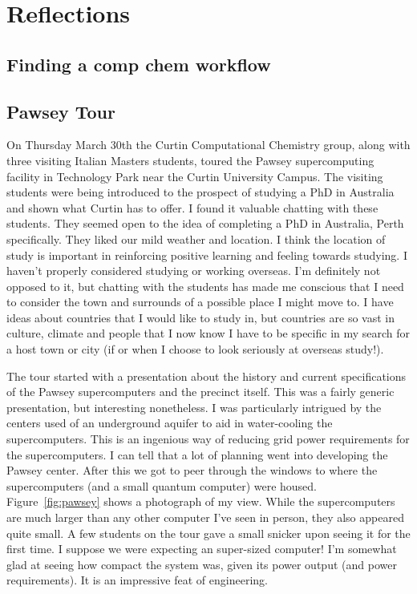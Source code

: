 \documentclass[11pt]{article}
\begin{document}
\section{Reflections}

\subsection{Finding a comp chem workflow}
\subsection{Pawsey Tour}

On Thursday March 30th the Curtin Computational Chemistry group, along with three visiting Italian Masters students, toured the Pawsey supercomputing facility in Technology Park near the Curtin University Campus. The visiting students were being introduced to the prospect of studying a PhD in Australia and shown what Curtin has to offer. I found it valuable chatting with these students. They seemed open to the idea of completing a PhD in Australia, Perth specifically. They liked our mild weather and location. I think the location of study is important in reinforcing positive learning and feeling towards studying. I haven't properly considered studying or working overseas. I'm definitely not opposed to it, but chatting with the students has made me conscious that I need to consider the town and surrounds of a possible place I might move to. I have ideas about countries that I would like to study in, but countries are so vast in culture, climate and people that I now know I have to be specific in my search for a host town or city (if or when I choose to look seriously at overseas study!).

The tour started with a presentation about the history and current specifications of the Pawsey supercomputers and the precinct itself. This was a fairly generic presentation, but interesting nonetheless. I was particularly intrigued by the centers used of an underground aquifer to aid in water-cooling the supercomputers. This is an ingenious way of reducing grid power requirements for the supercomputers. I can tell that a lot of planning went into developing the Pawsey center. After this we got to peer through the windows to where the supercomputers (and a small quantum computer) were housed. Figure~\ref{fig:pawsey} shows a photograph of my view. While the supercomputers are much larger than any other computer I've seen in person, they also appeared quite small. A few students on the tour gave a small snicker upon seeing it for the first time. I suppose we were expecting an super-sized computer! I'm somewhat glad at seeing how compact the system was, given its power output (and power requirements). It is an impressive feat of engineering.
\end{document}
